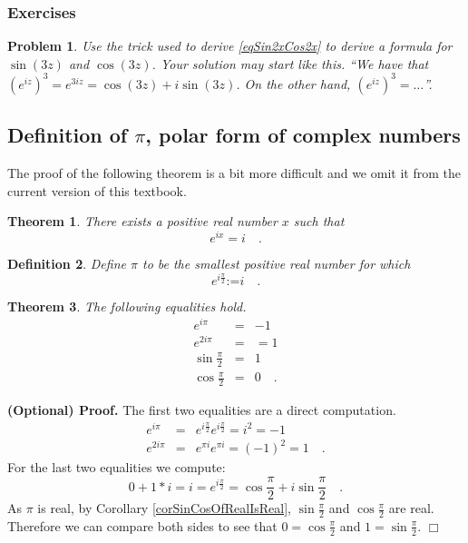 \documentclass[12pt]{book}
\newcommand{\eqdef}{\textbf{:=}}
\newcommand{\importantFormula}[1]{\begin{equation} \boxed{#1} \end{equation}}
\newenvironment{proofOptional}[1][]{ \noindent \textbf{(Optional) Proof#1.}}{$\Box$\medskip}
\newtheorem{problem}{Problem}[section]
\newtheorem{theorem}{Theorem}[section]
\newtheorem{definition}[theorem]{Definition}
\begin{document}
\subsubsection{Exercises}
\begin{problem}
Use the trick used to derive \eqref{eqSin2xCos2x} to derive a formula for $\sin(3z)$ and $\cos (3z)$. Your solution may start like this. ``We have that $(e^{iz})^3=e^{3iz}=\cos (3z)+i\sin(3z)$. On the other hand, $(e^{iz})^3= \dots$''.
\end{problem}
\subsection{Definition of $\pi$, polar form of complex numbers}\label{secPolarFormComplexNumbers}
\label{secDefinitionPi}

The proof of the following theorem is a bit more difficult and we omit it from the current version of this textbook.
\begin{theorem}
There exists a positive real number $x$ such that \index{$\pi$}
\importantFormula{
e^{ix}=i\quad .
}
\end{theorem}

\begin{definition}
Define $\pi$ to be the smallest positive real number for which
\importantFormula{
e^{i\frac{\pi}{2} }\eqdef i\quad .
}
\end{definition}



\begin{theorem} The following equalities hold. 
\begin{equation}\label{eqe^ipi}
\begin{array}{rcl}
\displaystyle e^{i\pi}&=&-1\\
\displaystyle e^{2i\pi}&=&=1\\
\displaystyle \sin \frac{\pi}2 &=& 1\\
\displaystyle \cos \frac{\pi}2 &=& 0\quad .
\end{array}
\end{equation}
\end{theorem}
\begin{proofOptional}
The first two equalities are a direct computation.
\[
\begin{array}{rcl}
\displaystyle e^{i\pi}&=&\displaystyle  e^{i\frac{\pi}2}e^{i\frac{\pi}2}= i^2= -1\\
\displaystyle e^{2i\pi}&=&\displaystyle  e^{\pi i} e^{\pi i}= (-1)^2=1\quad .
\end{array}
\]
For the last two equalities we compute:
\[
0+ 1*i=i=e^{i\frac{\pi}2}= \cos \frac{\pi}2 + i\sin \frac\pi 2\quad .
\]
As $\pi$ is real, by Corollary \ref{corSinCosOfRealIsReal}, $\sin\frac{\pi}{2}$ and $\cos \frac{\pi}{2}$ are real. Therefore we can compare both sides to see that $0=\cos \frac{\pi}{2}$ and $1=\sin \frac \pi 2$.
\end{proofOptional}
\end{document}
